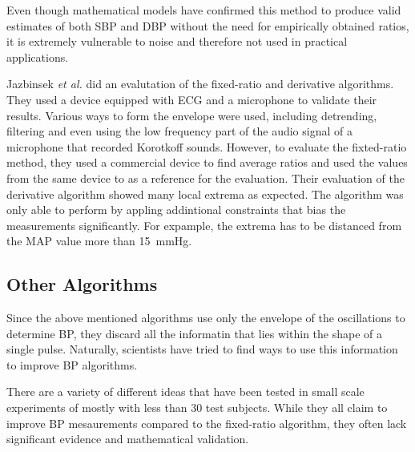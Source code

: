 Even though mathematical models have confirmed this method to produce valid estimates of both SBP and DBP without the need for empirically obtained ratios, it is extremely vulnerable to noise and therefore not used in practical applications.  \cite{Babbs2012,Chandrasekhar2019}

%


Jazbinsek \textit{et al.} did an evalutation of the fixed-ratio and derivative algorithms. They used a device equipped with ECG and a microphone to validate their results. Various ways to form the envelope were used, including detrending, filtering and even using the low frequency part of the audio signal of a microphone that recorded Korotkoff sounds. However, to evaluate the fixted-ratio method, they used a commercial device to find average ratios and used the values from the same device to as a reference for the evaluation. Their evaluation of the derivative algorithm showed many local extrema as expected. The algorithm was only able to perform by appling addintional constraints that bias the measurements significantly. For expample, the extrema has to be distanced from the MAP value more than \SI{15}{\mmHg}. \cite{Jazbinsek2010,Jazbinsek2005,Jazbinsek2016}


\subsection{Other Algorithms}
Since the above mentioned algorithms use only the envelope of the oscillations to determine BP, they discard all the informatin that lies within the shape of a single pulse. Naturally, scientists have tried to find ways to use this information to improve BP algorithms.

There are a variety of different ideas that have been tested in small scale experiments of mostly with less than 30 test subjects. While they all claim to improve BP mesaurements compared to the fixed-ratio algorithm, they often lack significant evidence and mathematical validation. 


